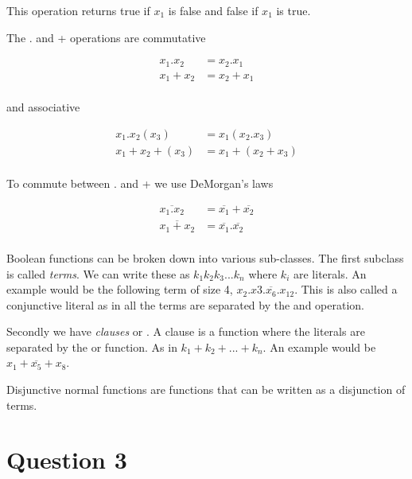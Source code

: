 \documentclass[10pt,a4paper]{article}
\begin{document}
This operation returns true if $x_1$ is false and false if $x_1$ is true.

The . and + operations are commutative 

\begin{equation}
\begin{split}
x_1.x_2 &= x_2.x_1 \\
x_1+x_2 &= x_2 + x_1 \\
\end{split}
\end{equation}

and associative

\begin{equation}
\begin{split}
x_1.x_2(x_3) &= x_1(x_2.x_3) \\
x_1 + x_2 + ( x_3 ) &= x_1 + ( x_2 + x_3 ) \\
\end{split}
\end{equation}

To commute between . and + we use DeMorgan's laws

\begin{equation}
\begin{split}
\overline{x_1.x_2} &= \overline{x_1} + \overline{x_2} \\
\overline{x_1 + x_2} &= \overline{x_1}.\overline{x_2} \\
\end{split}
\end{equation}

Boolean functions can be broken down into various sub-classes. The first subclass is called \emph{terms}. We can write these as $k_1k_2k_3...k_n$ where $k_i$ are literals. An example would be the following term of size 4, $x_2.x3.\overline{x_6}.x_{12}$. This is also called a conjunctive literal as in all the terms  are separated by the and operation.

Secondly we have \emph{clauses} or . A clause is a function where the literals are separated by the or function. As in $k_1+k_2 + ... + k_n $. An example would be $x_1 + \overline{x_5} + x_8$.

Disjunctive normal functions are functions that can be written as a disjunction of terms. 








\section{Question 3}
\end{document}
